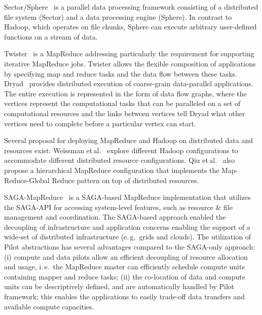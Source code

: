 \documentclass{acm_proc_article-sp}
\newcommand{\pnote}[1]{ {\textcolor{magenta} { ***pradeep: #1 }}}
\newcommand{\thirdrev}[1]{ {\textcolor{Bittersweet} { ***reviewer3: #1 }}}
\newcommand{\pnote}[1]{}
\begin{document}

Sector/Sphere~\cite{Gu_Grossman_2009} is a parallel data processing
framework consisting of a distributed file system (Sector) and a data
processing engine (Sphere). In contrast to Hadoop, which operates on
file chunks, Sphere can execute arbitrary user-defined functions on a
stream of data.

Twister~\cite{Ekanayake:2010:TRI:1851476.1851593} is a 
MapReduce addressing particularly the requirement for supporting iterative 
MapReduce jobs. Twister allows the flexible composition of applications by 
specifying map and reduce tasks and the data flow between these tasks. 
Dryad~\cite{Isard:2007:DDD:1272998.1273005} provides distributed execution of
coarse-grain data-parallel applications. The entire execution is represented in
the form of data flow graphs, where the vertices represent the computational
tasks that can be paralleled on a set of computational resources and the links
between vertices tell Dryad what other vertices need to complete before a
particular vertex can start.

Several proposal for deploying MapReduce and Hadoop on distributed data and
resources exist: Weissman et\,al.~\cite{weissman-mr-11} explore different Hadoop
configurations to accommodate different distributed resource configurations. 
Qiu et\,al.~\cite{ecmls11-mr-autodock} also propose a hierarchical
MapReduce configuration that implements the Map-Reduce-Global Reduce pattern on 
top of distributed resources. 

SAGA-MapReduce~\cite{Sehgal:2011:UAI:1945091.1945329} is a SAGA-based
MapReduce implementation that utilizes the SAGA-API for accessing
system-level features, such as resource \& file management and
coordination. The SAGA-based approach enabled the decoupling of
infrastructure and application concerns enabling the support of a
wide-set of distributed infrastructure (e.\,g,\ grids and clouds). The
utilization of Pilot abstractions has several advantages compared to
the SAGA-only approach: (i) compute and data pilots allow an efficient
decoupling of resource allocation and usage, i.\,e.\ the MapReduce
master can efficiently schedule compute units containing mapper and
reduce tasks; (ii) the co-location of data and compute units can be
descriptively defined, and are automatically handled by Pilot
framework; this enables the applications to easily trade-off data
transfers and available compute capacities.
\end{document}
